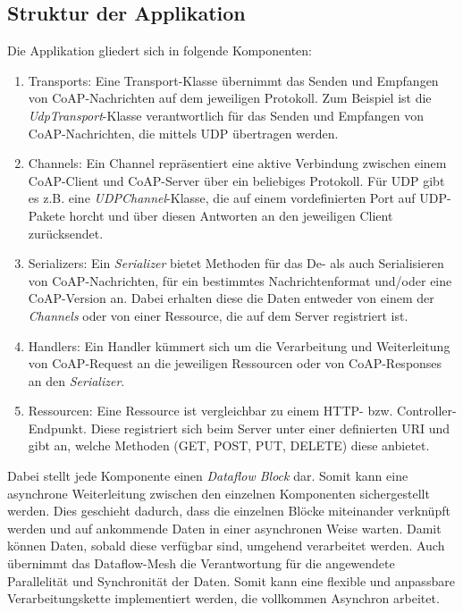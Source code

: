 \subsection{Struktur der Applikation}
\label{subsec:struktur-der-applikation}

Die Applikation gliedert sich in folgende Komponenten:
\begin{enumerate}
    \item Transports: Eine Transport-Klasse übernimmt das Senden und Empfangen von CoAP-Nachrichten auf dem jeweiligen Protokoll. Zum Beispiel ist die \textit{UdpTransport}-Klasse verantwortlich für das Senden und Empfangen von CoAP-Nachrichten, die mittels UDP übertragen werden.
    \item Channels: Ein Channel repräsentiert eine aktive Verbindung zwischen einem CoAP-Client und CoAP-Server über ein beliebiges Protokoll. Für UDP gibt es z.B. eine \textit{UDPChannel}-Klasse, die auf einem vordefinierten Port auf UDP-Pakete horcht und über diesen Antworten an den jeweiligen Client zurücksendet.
    \item Serializers: Ein \textit{Serializer} bietet Methoden für das De- als auch Serialisieren von CoAP-Nachrichten, für ein bestimmtes Nachrichtenformat und/oder eine CoAP-Version an. Dabei erhalten diese die Daten entweder von einem der \textit{Channels} oder von einer Ressource, die auf dem Server registriert ist.
    \item Handlers: Ein Handler kümmert sich um die Verarbeitung und Weiterleitung von CoAP-Request an die jeweiligen Ressourcen oder von CoAP-Responses an den \textit{Serializer}.
    \item Ressourcen: Eine Ressource ist vergleichbar zu einem HTTP- bzw. Controller-Endpunkt. Diese registriert sich beim Server unter einer definierten URI und gibt an, welche Methoden (GET, POST, PUT, DELETE) diese anbietet.
\end{enumerate}

Dabei stellt jede Komponente einen \textit{Dataflow Block} dar. Somit kann eine asynchrone Weiterleitung zwischen den einzelnen Komponenten sichergestellt werden. Dies geschieht dadurch, dass die einzelnen Blöcke miteinander verknüpft werden und auf ankommende Daten in einer asynchronen Weise warten. Damit können Daten, sobald diese verfügbar sind, umgehend verarbeitet werden. Auch übernimmt das Dataflow-Mesh die Verantwortung für die angewendete Parallelität und Synchronität der Daten. Somit kann eine flexible und anpassbare Verarbeitungskette implementiert werden, die vollkommen Asynchron arbeitet.

